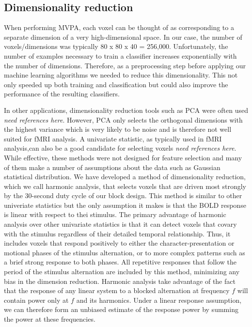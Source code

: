 \documentclass[preprint,5p,authoryear]{elsarticle}
\begin{document}
\subsection{Dimensionality reduction}
When performing MVPA, each voxel can be thought of as corresponding to a separate dimension of a very high-dimensional space.
In our case, the number of voxels/dimensions was typically 80 x 80 x 40 = 256,000.
Unfortunately, the number of examples necessary to train a classifier increases exponentially with the number of dimensions.
Therefore, as a preprocessing step before applying our machine learning algorithms we needed to reduce this dimensionality.
This not only speeded up both training and classification but could also improve the performance of the resulting classifiers.

In other applications, dimensionality reduction tools such as PCA were often used \emph{need references here}.
However, PCA only selects the orthogonal dimensions with the highest variance which is very likely to be noise and is therefore not well suited for fMRI analysis.
A univariate statistic, as typically used in  fMRI analysis,can also be a good candidate for selecting voxels \emph{need references here}.
While effective, these methods were not designed for feature selection and many of them make a number of assumptions about the data such as Gaussian statistical distribution.
We have developed a method of dimensionality reduction, which we call harmonic analysis, that selects voxels that are driven most strongly by the 30-second duty cycle of our block design.
This method is similar to other univeriate statistics but the only assumption it makes is that the BOLD response is linear with respect to thei stimulus.
The primary advantage  of harmonic analysis over other univariate statistics is that it can detect voxels that covary with the stimulus regardless of their detailed temporal relationship. Thus, it includes voxels that respond positively to either the character-presentation or motional phases of the stimulus alternation, or to more complex patterns such as a brief strong response to both phases. All repetitive responses that follow the period of the stimulus alternation are included by this method, minimizing any bias in the dimension reduction.
Harmonic analysis take advantage of the fact that the response of any linear system to a blocked alternation at frequency $f$ will contain power only at $f$ and its harmonics. 
Under a linear response assumption, we can therefore form an unbiased estimate of the response power by summing the power at these frequencies. 
\end{document}
